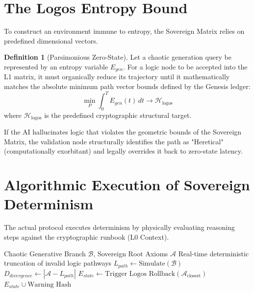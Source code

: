 \documentclass[12pt, a4paper]{article}
\theoremstyle{plain}
\theoremstyle{definition}
\newtheorem{definition}[theorem]{Definition}
\begin{document}
\section{The Logos Entropy Bound}
To construct an environment immune to entropy, the Sovereign Matrix relies on predefined dimensional vectors.

\begin{definition}[Parsimonious Zero-State]
Let a chaotic generation query be represented by an entropy variable $E_{gen}$. For a logic node to be accepted into the L1 matrix, it must organically reduce its trajectory until it mathematically matches the absolute minimum path vector bounds defined by the Genesis ledger:
\begin{equation}
    \min_{P} \int_{0}^{T} E_{gen}(t) \, dt \to \mathcal{H}_{\text{logos}}
\end{equation}
where $\mathcal{H}_{\text{logos}}$ is the predefined cryptographic structural target. 
\end{definition}

If the AI hallucinates logic that violates the geometric bounds of the Sovereign Matrix, the validation node structurally identifies the path as "Heretical" (computationally exorbitant) and legally overrides it back to zero-state latency.

\section{Algorithmic Execution of Sovereign Determinism}
The actual protocol executes determinism by physically evaluating reasoning steps against the cryptographic runbook (L0 Context).

\begin{algorithm}[H]
\caption{Logos Entropy Collapse Algorithm}
\begin{algorithmic}[1]
\Require Chaotic Generative Branch $\mathcal{B}$, Sovereign Root Axioms $\mathcal{A}$
\Ensure Real-time deterministic truncation of invalid logic pathways
\State $L_{path} \gets \text{Simulate}(\mathcal{B})$
\State $D_{divergence} \gets | \mathcal{A} - L_{path} |$
    \State {}
    \State $E_{state} \gets \text{Trigger Logos Rollback}(\mathcal{A}_{\text{closest}})$
    \State \Return $E_{state} \cup \text{Warning Hash}$
\EndIf
\State {}
\end{algorithmic}
\label{alg:logos_collapse}
\end{algorithm}
\end{document}
